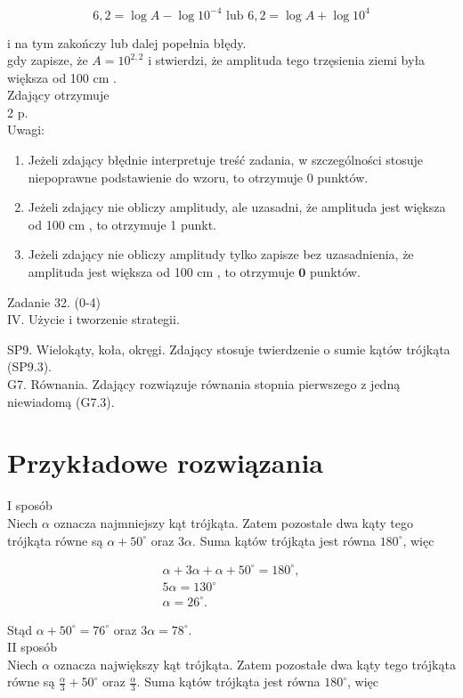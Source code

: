 \documentclass[10pt]{article}
\begin{document}
$$
6,2=\log A-\log 10^{-4} \text { lub } 6,2=\log A+\log 10^{4}
$$

i na tym zakończy lub dalej popełnia błędy.\\
gdy zapisze, że $A=10^{2,2}$ i stwierdzi, że amplituda tego trzęsienia ziemi była większa od 100 cm .\\
Zdający otrzymuje\\
2 p.\\
Uwagi:

\begin{enumerate}
  \item Jeżeli zdający błędnie interpretuje treść zadania, w szczególności stosuje niepoprawne podstawienie do wzoru, to otrzymuje 0 punktów.
  \item Jeżeli zdający nie obliczy amplitudy, ale uzasadni, że amplituda jest większa od 100 cm , to otrzymuje 1 punkt.
  \item Jeżeli zdający nie obliczy amplitudy tylko zapisze bez uzasadnienia, że amplituda jest większa od 100 cm , to otrzymuje $\mathbf{0}$ punktów.
\end{enumerate}

Zadanie 32. (0-4)\\
IV. Użycie i tworzenie strategii.

SP9. Wielokąty, koła, okręgi. Zdający stosuje twierdzenie o sumie kątów trójkąta (SP9.3).\\
G7. Równania. Zdający rozwiązuje równania stopnia pierwszego z jedną niewiadomą (G7.3).

\section*{Przykładowe rozwiązania}
I sposób\\
Niech $\alpha$ oznacza najmniejszy kąt trójkąta. Zatem pozostałe dwa kąty tego trójkąta równe są $\alpha+50^{\circ}$ oraz $3 \alpha$. Suma kątów trójkąta jest równa $180^{\circ}$, więc

$$
\begin{gathered}
\alpha+3 \alpha+\alpha+50^{\circ}=180^{\circ}, \\
5 \alpha=130^{\circ} \\
\alpha=26^{\circ} .
\end{gathered}
$$

Stąd $\alpha+50^{\circ}=76^{\circ}$ oraz $3 \alpha=78^{\circ}$.\\
II sposób\\
Niech $\alpha$ oznacza największy kąt trójkąta. Zatem pozostałe dwa kąty tego trójkąta równe są $\frac{\alpha}{3}+50^{\circ}$ oraz $\frac{\alpha}{3}$. Suma kątów trójkąta jest równa $180^{\circ}$, więc
\end{document}
